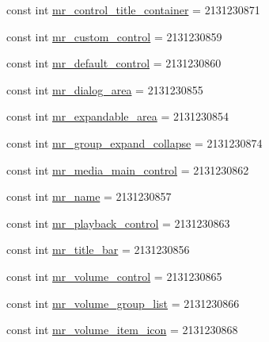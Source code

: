 \begin{DoxyCompactItemize}
const int \mbox{\hyperlink{class_f_w_p_s___app_1_1_droid_1_1_resource_1_1_id_adf0d8f6b023aa52be7be52eced51aa08}{mr\+\_\+control\+\_\+title\+\_\+container}} = 2131230871
\item 
const int \mbox{\hyperlink{class_f_w_p_s___app_1_1_droid_1_1_resource_1_1_id_aebe41fbf3414a0ff34d9d600813d1002}{mr\+\_\+custom\+\_\+control}} = 2131230859
\item 
const int \mbox{\hyperlink{class_f_w_p_s___app_1_1_droid_1_1_resource_1_1_id_a13ce4ff9da8581a4f9730ad5b273f0ab}{mr\+\_\+default\+\_\+control}} = 2131230860
\item 
const int \mbox{\hyperlink{class_f_w_p_s___app_1_1_droid_1_1_resource_1_1_id_a43068e4950ef1c9f0adbea436e404a43}{mr\+\_\+dialog\+\_\+area}} = 2131230855
\item 
const int \mbox{\hyperlink{class_f_w_p_s___app_1_1_droid_1_1_resource_1_1_id_aeb2181e52dc1f8fb71eb7d2431c5316c}{mr\+\_\+expandable\+\_\+area}} = 2131230854
\item 
const int \mbox{\hyperlink{class_f_w_p_s___app_1_1_droid_1_1_resource_1_1_id_a7083db18f30510f749cee569471944c3}{mr\+\_\+group\+\_\+expand\+\_\+collapse}} = 2131230874
\item 
const int \mbox{\hyperlink{class_f_w_p_s___app_1_1_droid_1_1_resource_1_1_id_a4ba4ef73cfd3ea960af2e3cffc4619da}{mr\+\_\+media\+\_\+main\+\_\+control}} = 2131230862
\item 
const int \mbox{\hyperlink{class_f_w_p_s___app_1_1_droid_1_1_resource_1_1_id_a9d256f7f19b270e0aafa72eb3eb942f7}{mr\+\_\+name}} = 2131230857
\item 
const int \mbox{\hyperlink{class_f_w_p_s___app_1_1_droid_1_1_resource_1_1_id_a57d91ad45854a9dacbce6836d44bea52}{mr\+\_\+playback\+\_\+control}} = 2131230863
\item 
const int \mbox{\hyperlink{class_f_w_p_s___app_1_1_droid_1_1_resource_1_1_id_af24ab2c9d112bbe36433962f725d3738}{mr\+\_\+title\+\_\+bar}} = 2131230856
\item 
const int \mbox{\hyperlink{class_f_w_p_s___app_1_1_droid_1_1_resource_1_1_id_ab33ba3ac41bf3b9f5e2728059a4c2c04}{mr\+\_\+volume\+\_\+control}} = 2131230865
\item 
const int \mbox{\hyperlink{class_f_w_p_s___app_1_1_droid_1_1_resource_1_1_id_a43af9e2421a92a82f61e6092363cb637}{mr\+\_\+volume\+\_\+group\+\_\+list}} = 2131230866
\item 
const int \mbox{\hyperlink{class_f_w_p_s___app_1_1_droid_1_1_resource_1_1_id_a3cd2c0f5cff1d0340b3867feec97787b}{mr\+\_\+volume\+\_\+item\+\_\+icon}} = 2131230868

\end{DoxyCompactItemize}
